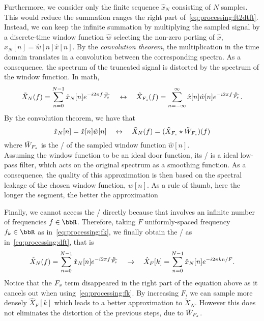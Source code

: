 \mynewline
Furthermore, we consider only the finite sequence $\hat{x}_N$ consisting of $N$ samples.
This would reduce the summation ranges the right part of~\cref{eq:processing:ft2dtft}.
Instead, we can keep the infinite summation by multiplying the sampled signal by a discrete-time window function $\hat{w}$ selecting the non-zero porting of $\hat{x}$, $\hat{x}_N[n] = \hat{w}[n]\hat{x}[n]$.
By the \textit{convolution theorem}, the multiplication in the time domain translates in a convolution between the corresponding spectra.
As a consequence, the spectrum of the truncated signal is distorted by the spectrum of the window function.
In math,
\begin{equation}\label{eq:processing:ft2dtft}
    \tilde{X}_N(f) =
    \sum_{n=0}^{N-1}
    \hat{x}_N[n]
    {e}^{-{i}2\pi f \frac{n}{F_s}}
    \quad \leftrightarrow \quad
    \tilde{X}_{F_s}( f) =
    \sum_{n = -\infty}^{\infty}
    \hat{x}[ n] \hat{w}[ n]
    {e}^{-{i}2\pi f \frac{n}{F_s}}
    .
\end{equation}
By the convolution theorem, we have that
\begin{equation}
    \hat{x}_N[n] = \hat{x}[ n] \hat{w}[ n]
    \quad \leftrightarrow \quad
    \tilde{X}_{N}(f) = (\tilde{X}_{F_s} \star \tilde{W}_{F_s})(f)
\end{equation}
where $\tilde{W}_{F_s}$ is the \DTFT/ of the sampled window function $\hat{w}[n]$.
\\Assuming the window function to be an ideal door function, its \DTFT/ is a ideal low-pass filter, which acts on the original spectrum as a smoothing function.
As a consequence, the quality of this approximation is then based on the spectral leakage of the chosen window function, $w[n]$.
As a rule of thumb, here the longer the segment, the better the approximation%

\mynewline
Finally, we cannot access the \DTFT/ directly because that involves an infinite number of frequencies $f \in \R$.
Therefore, taking $F$ uniformly-spaced frequency $f_k\in\R$ as in~\cref{eq:processing:fk}, we finally obtain the \DFT/ as in~\cref{eq:processing:dft}, that is
\begin{equation}
    \tilde{X}_N(f) =
    \sum_{n=0}^{N-1}
    \hat{x}_N[n]
    {e}^{-{i}2\pi f \frac{n}{F_s}}
    \quad \rightarrow \quad
    \hat{X}_F[k] =
    \sum_{n=0}^{N-1}
    \hat{x}_N[n]
    {e}^{-{i}2\pi k n / F}
    .
\end{equation}
Notice that the $F_s$ term disappeared in the right part of the equation above as it cancels out when using~\cref{eq:processing:fk}.
By increasing $F$, we can sample more densely $\hat{X}_F[k]$ which leads to a better approximation to $\tilde{X}_N$.
However this does not eliminates the distortion of the previous steps, due to $\tilde{W}_{F_s}$.

